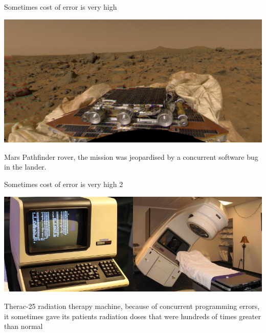 \documentclass[12pt]{beamer}
\begin{document}
  \begin{frame}{Sometimes cost of error is very high}
      \begin{center}
          \includegraphics[scale=0.12]{figures/pathfinder.jpg}
      \end{center}
      \begin{alertblock}{Mars Pathfinder}
          rover, the mission was jeopardised by a concurrent
          software bug in the lander.~\cite{Pathfinder2013}
      \end{alertblock}
  \end{frame}
  \begin{frame}{Sometimes cost of error is very high 2}
      \begin{center}
          \includegraphics[scale=0.5]{figures/therac.jpg}
      \end{center}
      \begin{alertblock}{Therac-25}
          radiation therapy machine, because of concurrent
          programming errors, it sometimes gave its patients radiation doses
          that were hundreds of times greater than normal~\cite{wiki:therac}
      \end{alertblock}
  \end{frame}
\end{document}
